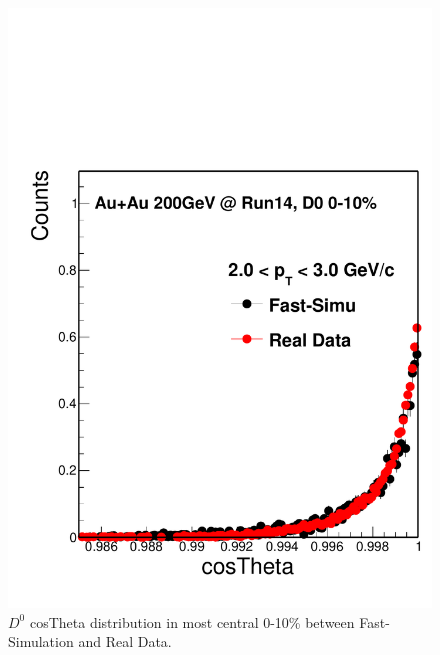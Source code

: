 \begin{figure}[htbp]
\begin{minipage}[htbp]{0.52\linewidth}
\centering
\includegraphics[width=1.0\textwidth,angle=0]{figure/Run14_D0HFT/pointingangle.pdf}
\caption{ $D^0$ cosTheta distribution in most central 0-10\% between Fast-Simulation and Real Data.\label{pointingangle}}
\end{minipage}
\hfill
\begin{minipage}[htbp]{0.52\linewidth}
\centering

\end{minipage}
\end{figure}
